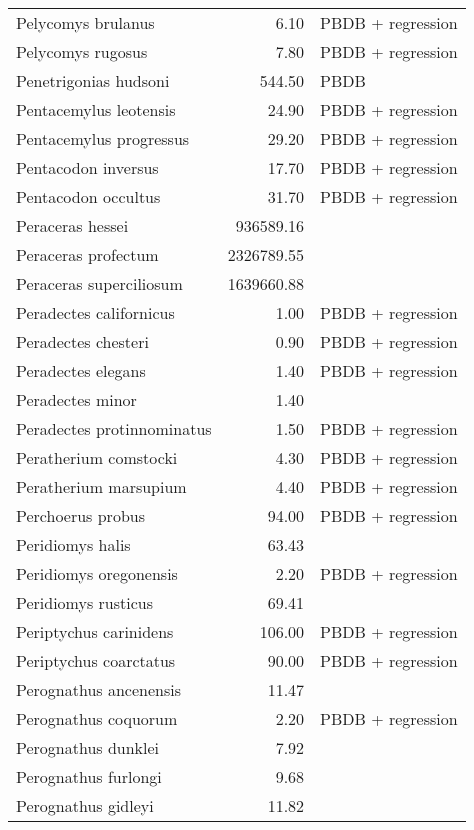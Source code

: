 \begin{table}[ht]
\begin{tabular}{lrl}
  Pelycomys brulanus & 6.10 & PBDB + regression \\ 
  Pelycomys rugosus & 7.80 & PBDB + regression \\ 
  Penetrigonias hudsoni & 544.50 & PBDB \\ 
  Pentacemylus leotensis & 24.90 & PBDB + regression \\ 
  Pentacemylus progressus & 29.20 & PBDB + regression \\ 
  Pentacodon inversus & 17.70 & PBDB + regression \\ 
  Pentacodon occultus & 31.70 & PBDB + regression \\ 
  Peraceras hessei & 936589.16 & \cite{Tomiya2013} \\ 
  Peraceras profectum & 2326789.55 & \cite{Tomiya2013} \\ 
  Peraceras superciliosum & 1639660.88 & \cite{Tomiya2013} \\ 
  Peradectes californicus & 1.00 & PBDB + regression \\ 
  Peradectes chesteri & 0.90 & PBDB + regression \\ 
  Peradectes elegans & 1.40 & PBDB + regression \\ 
  Peradectes minor & 1.40 & \cite{Taylor1976} \\ 
  Peradectes protinnominatus & 1.50 & PBDB + regression \\ 
  Peratherium comstocki & 4.30 & PBDB + regression \\ 
  Peratherium marsupium & 4.40 & PBDB + regression \\ 
  Perchoerus probus & 94.00 & PBDB + regression \\ 
  Peridiomys halis & 63.43 & \cite{Tomiya2013} \\ 
  Peridiomys oregonensis & 2.20 & PBDB + regression \\ 
  Peridiomys rusticus & 69.41 & \cite{Tomiya2013} \\ 
  Periptychus carinidens & 106.00 & PBDB + regression \\ 
  Periptychus coarctatus & 90.00 & PBDB + regression \\ 
  Perognathus ancenensis & 11.47 & \cite{Tomiya2013} \\ 
  Perognathus coquorum & 2.20 & PBDB + regression \\ 
  Perognathus dunklei & 7.92 & \cite{Tomiya2013} \\ 
  Perognathus furlongi & 9.68 & \cite{Tomiya2013} \\ 
  Perognathus gidleyi & 11.82 & \cite{Tomiya2013} \\ 

\end{tabular}
\end{table}
